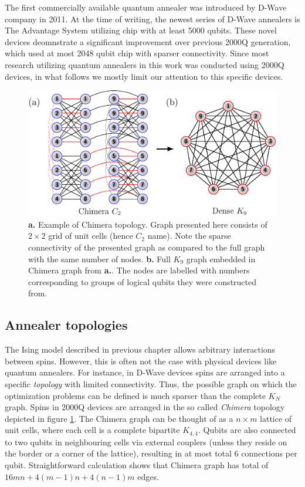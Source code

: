 The first commercially available quantum annealer was introduced by D-Wave company in 2011. At the time of writing, the newest series of D-Wave annealers is The Advantage System utilizing chip with at least 5000 qubits. These novel devices deomnstrate a significant improvement over previous 2000Q generation, which used at most 2048 qubit chip with sparser connectivity. Since most research utilizing quantum annealers in this work was conducted using 2000Q devices, in what follows we mostly limit our attention to this specific devices.

\begin{figure}[h]
    \centering
    \includegraphics[width=\textwidth]{figures/chimera.pdf}
    \caption{\textbf{a.} Example of Chimera topology. Graph presented here consists of $2 \times 2$ grid of unit cells (hence $C_2$ name). Note the sparse connectivity of the presented graph as compared to the full graph with the same number of nodes. \textbf{b.} Full $K_9$ graph embedded in Chimera graph from \textbf{a.}. The nodes are labelled with numbers corresponding to groups of logical qubits they were constructed from.}
    \label{fig:chimera}
\end{figure}


\subsection{Annealer topologies}

The Ising model described in previous chapter allows arbitrary interactions between spins. However, this is often not the case with physical devices like quantum annealers. For instance, in D-Wave devices spins are arranged into a specific \emph{topology} with limited connectivity. Thus, the possible graph on which the optimization problems can be defined is much sparser than the complete $K_{N}$ graph. Spins in 2000Q devices are arranged in the so called \emph{Chimera} topology depicted in figure \ref{fig:chimera}. The Chimera graph can be thought of as a $n \times m$ lattice of unit cells, where each cell is a complete bipartite $K_{4,4}$. Qubits are also connected to two qubits in neighbouring cells via external couplers (unless they reside on the border or a corner of the lattice), resulting in at most total 6 connections per qubit. Straightforward calculation shows that Chimera graph has total of $16mn + 4(m-1)n + 4(n-1)m$ edges.

